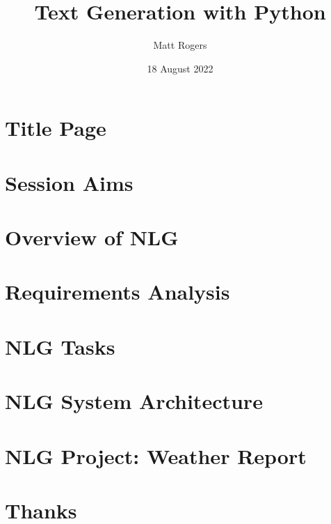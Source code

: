 \documentclass[10pt,aspectratio=169]{beamer}
\author{Matt Rogers}
\title{Text Generation with Python}
\date{18 August 2022}
\begin{document}
\section{Title Page}


\section{Session Aims}


\section{Overview of NLG}


\section{Requirements Analysis}



\section{NLG Tasks}



\section{NLG System Architecture}


\section{NLG Project: Weather Report}












\section{Thanks}

\end{document}
